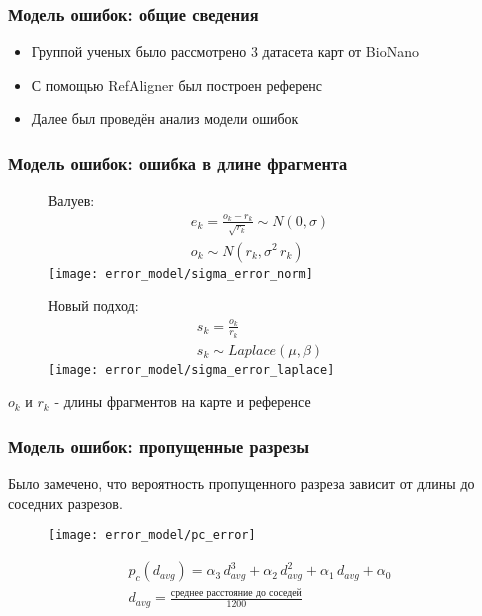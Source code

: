 \begin{frame}
\frametitle{Модель ошибок: общие сведения}
\begin{itemize}
  \item Группой ученых было рассмотрено 3 датасета карт от BioNano \cite{error_model}
  \item С помощью RefAligner был построен референс
  \item Далее был проведён анализ модели ошибок
\end{itemize}
\end{frame}

\begin{frame}
\frametitle{Модель ошибок: ошибка в длине фрагмента}


\begin{figure}
\centering
\begin{minipage}{.5\textwidth}
  Валуев:
  \begin{gather*}
  e_k = \frac{o_k - r_k}{\sqrt{r_k}} \sim N(0, \sigma) \\
  o_k \sim N(r_k, \sigma^2 \, r_k)
  \end{gather*}
  \centering
  \texttt{[image: error\_model/sigma\_error\_norm]}
\end{minipage}%
\begin{minipage}{.5\textwidth}
  Новый подход:
  \begin{gather*}
  s_k = \frac{o_k}{r_k} \\
  s_k \sim Laplace(\mu, \beta)
  \end{gather*}
  \centering
  \texttt{[image: error\_model/sigma\_error\_laplace]}
\end{minipage}
\end{figure}
$o_k$ и $r_k$ - длины фрагментов на карте и референсе
\end{frame}

\begin{frame}
\frametitle{Модель ошибок: пропущенные разрезы}
Было замечено, что вероятность пропущенного разреза зависит от длины до соседних разрезов.
\begin{figure}
  \centering
  \texttt{[image: error\_model/pc\_error]}
\end{figure}
\begin{gather*}
p_c (d_{avg}) = \alpha_3 \, d_{avg}^3 + \alpha_2 \, d_{avg}^2 +  \alpha_1 \, d_{avg} + \alpha_0 \\
d_{avg} = \frac{\text{среднее расстояние до соседей}}{1200}
\end{gather*}
\end{frame}

